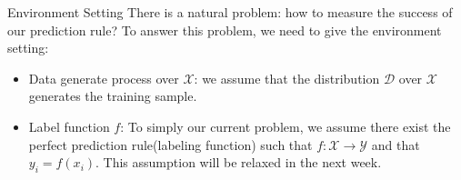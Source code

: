 \documentclass{beamer}
\begin{document}
\begin{frame}{Environment Setting}
	There is a natural problem: how to measure the success of our prediction rule? To answer this problem, we need to give the environment setting:
	\begin{itemize}
		\item Data generate process over $\mathcal{X}$: we assume that the distribution $\mathcal{D}$ over $\mathcal{X}$ generates the training sample.
		\item Label function $f$: To simply our current problem, we assume there exist the perfect prediction rule(labeling function) such that $f: \mathcal{X} \rightarrow \mathcal{Y}$ and that $y_i = f(x_i)$. This assumption will be relaxed in the next week.
	\end{itemize}
\end{frame}
\end{document}
